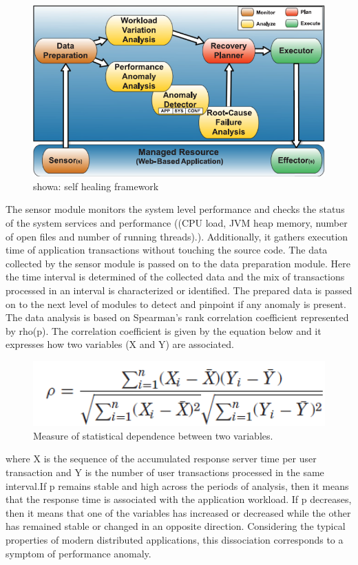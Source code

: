 \begin{compactitem}
\begin{figure}[H]
\center
\includegraphics[width=5in]{img/selfhealingframework}
\caption{showa: self healing framework}
\end{figure}  

The sensor module monitors the system level performance and checks the status of the system services and performance ((CPU load, JVM heap memory, number of open files and number of running threads).). Additionally, it gathers execution time of application transactions without touching the source code. The data collected by the sensor module is passed on to the data preparation module. Here the time interval is determined of the collected data and the mix of transactions processed in an interval is characterized or identified. The prepared data is passed on to the next level of modules to detect and pinpoint if any anomaly is present. The data analysis is based on Spearman's rank correlation coefficient represented by rho(p). The correlation coefficient is given by the equation below and it expresses how two variables (X and Y) are associated.

\begin{figure}[H]
\includegraphics[width=5in]{img/formulae}
\caption{Measure of statistical dependence between two variables.}
\end{figure} 

where X is the sequence of the accumulated response server time per user transaction and Y is the number of user transactions processed in the same interval.If p remains stable and high across the periods of analysis, then it means that the response time is associated with the application workload. If p  decreases, then it means that one of the variables has increased or decreased while the other has remained stable or changed in an opposite direction. Considering the typical properties of modern distributed applications, this dissociation corresponds to a symptom of performance anomaly.


\end{compactitem}
